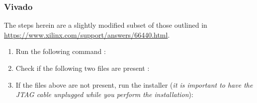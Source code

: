 \subsubsection{Vivado}
\begin{flushleft}
The steps herein are a slightly modified subset of those outlined in \url{https://www.xilinx.com/support/answers/66440.html}.
\end{flushleft}
\begin{enumerate}
\item Run the following command : 
\item Check if the following two files are present : 
\item If the files above are not present, run the installer (\textit{it is important to have the JTAG cable unplugged while you perform the installation}):\\ 
\end{enumerate}


